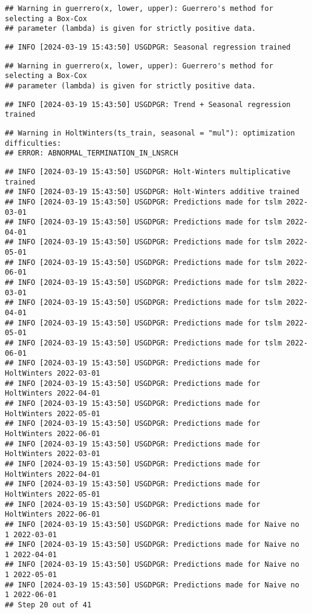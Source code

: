 \documentclass[
]{article}
\begin{document}
\begin{verbatim}
## Warning in guerrero(x, lower, upper): Guerrero's method for selecting a Box-Cox
## parameter (lambda) is given for strictly positive data.
\end{verbatim}

\begin{verbatim}
## INFO [2024-03-19 15:43:50] USGDPGR: Seasonal regression trained
\end{verbatim}

\begin{verbatim}
## Warning in guerrero(x, lower, upper): Guerrero's method for selecting a Box-Cox
## parameter (lambda) is given for strictly positive data.
\end{verbatim}

\begin{verbatim}
## INFO [2024-03-19 15:43:50] USGDPGR: Trend + Seasonal regression trained
\end{verbatim}

\begin{verbatim}
## Warning in HoltWinters(ts_train, seasonal = "mul"): optimization difficulties:
## ERROR: ABNORMAL_TERMINATION_IN_LNSRCH
\end{verbatim}

\begin{verbatim}
## INFO [2024-03-19 15:43:50] USGDPGR: Holt-Winters multiplicative trained
## INFO [2024-03-19 15:43:50] USGDPGR: Holt-Winters additive trained
## INFO [2024-03-19 15:43:50] USGDPGR: Predictions made for tslm 2022-03-01
## INFO [2024-03-19 15:43:50] USGDPGR: Predictions made for tslm 2022-04-01
## INFO [2024-03-19 15:43:50] USGDPGR: Predictions made for tslm 2022-05-01
## INFO [2024-03-19 15:43:50] USGDPGR: Predictions made for tslm 2022-06-01
## INFO [2024-03-19 15:43:50] USGDPGR: Predictions made for tslm 2022-03-01
## INFO [2024-03-19 15:43:50] USGDPGR: Predictions made for tslm 2022-04-01
## INFO [2024-03-19 15:43:50] USGDPGR: Predictions made for tslm 2022-05-01
## INFO [2024-03-19 15:43:50] USGDPGR: Predictions made for tslm 2022-06-01
## INFO [2024-03-19 15:43:50] USGDPGR: Predictions made for HoltWinters 2022-03-01
## INFO [2024-03-19 15:43:50] USGDPGR: Predictions made for HoltWinters 2022-04-01
## INFO [2024-03-19 15:43:50] USGDPGR: Predictions made for HoltWinters 2022-05-01
## INFO [2024-03-19 15:43:50] USGDPGR: Predictions made for HoltWinters 2022-06-01
## INFO [2024-03-19 15:43:50] USGDPGR: Predictions made for HoltWinters 2022-03-01
## INFO [2024-03-19 15:43:50] USGDPGR: Predictions made for HoltWinters 2022-04-01
## INFO [2024-03-19 15:43:50] USGDPGR: Predictions made for HoltWinters 2022-05-01
## INFO [2024-03-19 15:43:50] USGDPGR: Predictions made for HoltWinters 2022-06-01
## INFO [2024-03-19 15:43:50] USGDPGR: Predictions made for Naive no  1 2022-03-01
## INFO [2024-03-19 15:43:50] USGDPGR: Predictions made for Naive no  1 2022-04-01
## INFO [2024-03-19 15:43:50] USGDPGR: Predictions made for Naive no  1 2022-05-01
## INFO [2024-03-19 15:43:50] USGDPGR: Predictions made for Naive no  1 2022-06-01
## Step 20 out of 41
\end{verbatim}
\end{document}
